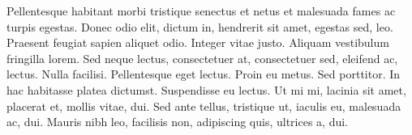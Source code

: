 \documentclass[AMA,Times1COL]{WileyNJDv5} %
\begin{document}
Pellentesque habitant morbi tristique senectus et netus et malesuada fames ac turpis egestas. Donec odio elit,
dictum in, hendrerit sit amet, egestas sed, leo. Praesent feugiat sapien aliquet odio. Integer vitae justo. Aliquam
vestibulum fringilla lorem. Sed neque lectus, consectetuer at, consectetuer sed, eleifend ac, lectus. Nulla facilisi.
Pellentesque eget lectus. Proin eu metus. Sed porttitor. In hac habitasse platea dictumst. Suspendisse eu lectus. Ut
mi mi, lacinia sit amet, placerat et, mollis vitae, dui. Sed ante tellus, tristique ut, iaculis eu, malesuada ac, dui.
Mauris nibh leo, facilisis non, adipiscing quis, ultrices a, dui.

\end{document}
